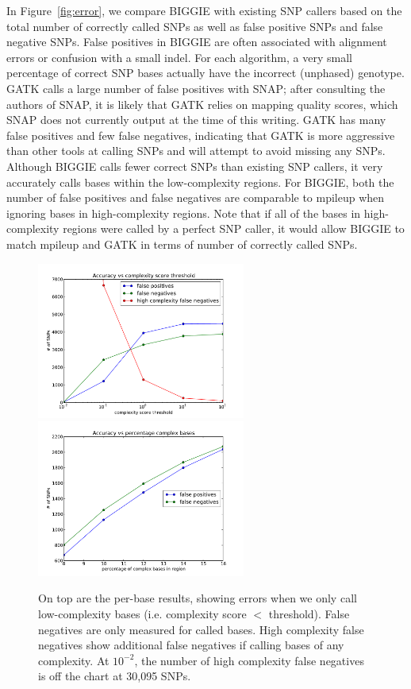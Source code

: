 \documentclass[10pt]{article}
\begin{document}
In Figure~\ref{fig:error}, we compare BIGGIE with existing SNP callers based on the total number of correctly called SNPs as well as false positive SNPs and false negative SNPs.
False positives in BIGGIE are often associated with alignment errors or confusion with a small indel.
For each algorithm, a very small percentage of correct SNP bases actually have the incorrect (unphased) genotype. %
GATK calls a large number of false positives with SNAP; after consulting the authors of SNAP, it is likely that GATK relies on mapping quality scores, which SNAP does not currently output at the time of this writing.
GATK has many false positives and few false negatives, indicating that GATK is more aggressive than other tools at calling SNPs and will attempt to avoid missing any SNPs.
Although BIGGIE calls fewer correct SNPs than existing SNP callers, it very accurately calls bases within the low-complexity regions.
For BIGGIE, both the number of false positives and false negatives are comparable to mpileup when ignoring bases in high-complexity regions.
Note that if all of the bases in high-complexity regions were called by a perfect SNP caller, it would allow BIGGIE to match mpileup and GATK in terms of number of correctly called SNPs.

\begin{figure}[t!]
	\includegraphics[width=2.7in]{figs/base_accuracy_vs_thresh.pdf}
	\includegraphics[width=2.7in]{figs/region_accuracy_vs_thresh.pdf}
	\caption{On top are the per-base results, showing errors when we only call low-complexity bases (i.e. complexity score $<$ threshold).
  False negatives are only measured for called bases.
  High complexity false negatives show additional false negatives if calling bases of any complexity.
  At $10^{-2}$, the number of high complexity false negatives is off the chart at 30,095 SNPs.}
  \label{fig:thresh}
\end{figure}
\end{document}
